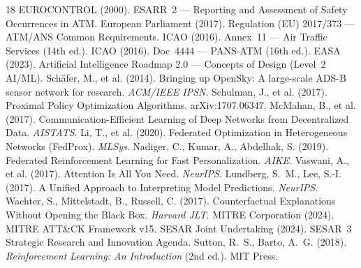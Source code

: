 \documentclass[11pt]{article}
\begin{document}
\begin{thebibliography}{18}\small
{} EUROCONTROL (2000). ESARR~2 --- Reporting and Assessment of Safety Occurrences in ATM.
 European Parliament (2017). Regulation (EU) 2017/373 --- ATM/ANS Common Requirements.
 ICAO (2016). Annex~11 --- Air Traffic Services (14th ed.).
 ICAO (2016). Doc~4444 --- PANS-ATM (16th ed.).
 EASA (2023). Artificial Intelligence Roadmap 2.0 --- Concepts of Design (Level~2 AI/ML).
 Sch\"afer, M., et al. (2014). Bringing up OpenSky: A large-scale ADS-B sensor network for research. \emph{ACM/IEEE IPSN}.
 Schulman, J., et al. (2017). Proximal Policy Optimization Algorithms. arXiv:1707.06347.
 McMahan, B., et al. (2017). Communication-Efficient Learning of Deep Networks from Decentralized Data. \emph{AISTATS}.
 Li, T., et al. (2020). Federated Optimization in Heterogeneous Networks (FedProx). \emph{MLSys}.
 Nadiger, C., Kumar, A., Abdelhak, S. (2019). Federated Reinforcement Learning for Fast Personalization. \emph{AIKE}.
 Vaswani, A., et al. (2017). Attention Is All You Need. \emph{NeurIPS}.
 Lundberg, S.~M., Lee, S.-I. (2017). A Unified Approach to Interpreting Model Predictions. \emph{NeurIPS}.
 Wachter, S., Mittelstadt, B., Russell, C. (2017). Counterfactual Explanations Without Opening the Black Box. \emph{Harvard JLT}.
 MITRE Corporation (2024). MITRE ATT\&CK Framework v15.
 SESAR Joint Undertaking (2024). SESAR~3 Strategic Research and Innovation Agenda.
 Sutton, R.~S., Barto, A.~G. (2018). \emph{Reinforcement Learning: An Introduction} (2nd ed.). MIT Press.
\end{thebibliography}
\end{document}
